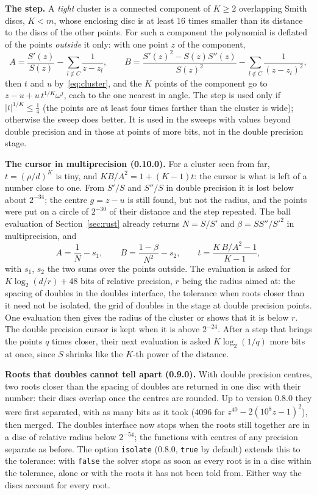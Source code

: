 \documentclass[10pt,a4paper]{article}
\theoremstyle{definition}
\numberwithin{equation}{section}
\begin{document}
\textbf{The step.} A \emph{tight} cluster is a connected component of $K\ge2$ overlapping Smith discs,
$K<m$, whose enclosing disc is at least 16 times smaller than its distance to the discs of the other
points. For such a component the polynomial is deflated of the points \emph{outside} it only: with one
point $z$ of the component,
\[
 A=\frac{S'(z)}{S(z)}-\sum_{l\notin C}\frac1{z-z_l},\qquad
 B=\frac{S'(z)^2-S(z)S''(z)}{S(z)^2}-\sum_{l\notin C}\frac1{(z-z_l)^2},
\]
then $t$ and $u$ by~\eqref{eq:cluster}, and the $K$ points of the component go to
$z-u+u\,t^{1/K}\omega^j$, each to the one nearest in angle. The step is used only if $|t|^{1/K}\le\frac14$
(the points are at least four times farther than the cluster is wide); otherwise the sweep does better.
It is used in the sweeps with values beyond double precision and in those at points of more bits, not in
the double precision stage.

\textbf{The cursor in multiprecision (0.10.0).} For a cluster seen from far, $t=(\rho/d)^K$ is tiny, and
$KB/A^2=1+(K-1)t$: the cursor is what is left of a number close to one. From $S'/S$ and $S''/S$ in double
precision it is lost below about $2^{-34}$; the centre $g=z-u$ is still found, but not the radius, and the
points were put on a circle of $2^{-30}$ of their distance and the step repeated. The ball evaluation of
Section~\ref{sec:rust} already returns $N=S/S'$ and $\beta=SS''/S'^2$ in multiprecision, and
\[
 A=\frac1N-s_1,\qquad B=\frac{1-\beta}{N^2}-s_2,\qquad t=\frac{K\,B/A^2-1}{K-1},
\]
with $s_1$, $s_2$ the two sums over the points outside. The evaluation is asked for
$K\log_2(d/r)+48$ bits of relative precision, $r$ being the radius aimed at: the spacing of doubles in the
doubles interface, the tolerance when roots closer than it need not be isolated, the grid of doubles in
the stage at double precision points. One evaluation then gives the radius of the cluster or shows that
it is below $r$. The double precision cursor is kept when it is above $2^{-24}$. After a step that
brings the points $q$ times closer, their next evaluation is asked $K\log_2(1/q)$ more bits at once, since
$S$ shrinks like the $K$-th power of the distance.

\textbf{Roots that doubles cannot tell apart (0.9.0).} With double precision centres, two roots closer
than the spacing of doubles are returned in one disc with their number: their discs overlap once the
centres are rounded. Up to version 0.8.0 they were first separated, with as many bits as it took (4096 for
$z^{40}-2(10^8z-1)^2$), then merged. The doubles interface now stops when the roots still together are in a
disc of relative radius below $2^{-54}$; the functions with centres of any precision separate as before.
The option \texttt{isolate} (0.8.0, \texttt{true} by default) extends this to the tolerance: with
\texttt{false} the solver stops as soon as every root is in a disc within the tolerance, alone or with the
roots it has not been told from. Either way the discs account for every root.
\end{document}
